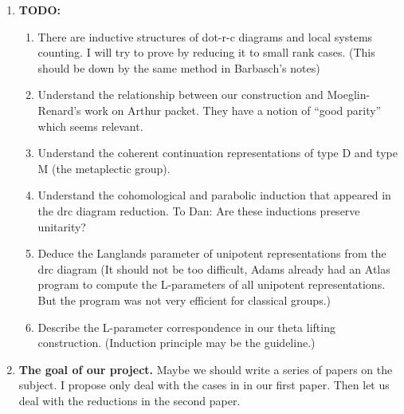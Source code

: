 \documentclass[12pt,a4paper]{amsart}
\numberwithin{equation}{section}
\theoremstyle{remark}
\begin{document}
\begin{enumerate}
\item {\bfseries TODO:}
  \begin{enumerate}
  \item There are inductive structures of dot-r-c diagrams and local systems
    counting.  I will try to prove  by reducing it
    to small rank cases. (This should be down by the same method in Barbasch's
    notes)
  \item Understand the relationship between our construction and
    Moeglin-Renard's work on Arthur packet.  They have a notion of ``good
    parity'' which seems relevant.
  \item Understand the coherent continuation representations of type D and type M
    (the metaplectic group).  
  \item Understand the cohomological and parabolic induction that appeared in
    the drc diagram reduction. {\color{red} To Dan: Are these inductions
      preserve unitarity?}
  \item Deduce the Langlands parameter of unipotent representations from the drc
    diagram (It should not be too difficult, Adams already had an Atlas program
    to compute the L-parameters of all unipotent representations. But the program
    was not very efficient for classical groups.)  
  \item Describe the L-parameter correspondence in our theta lifting construction.  
    (Induction principle may be the guideline.)
  \end{enumerate}
\item {\bfseries The goal of our project.}  Maybe we should write a series of
  papers on the subject.  I propose only deal with the cases in
   in our first paper. Then let us deal with the
  reductions in the second paper.
\end{enumerate}
\end{document}
